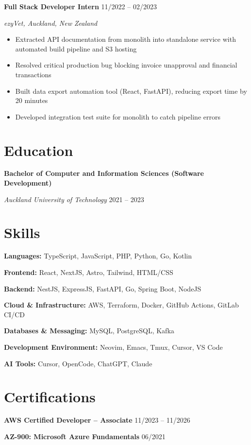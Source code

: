 \documentclass[11pt,a4paper]{article}
\begin{document}
\textbf{Full Stack Developer Intern} \hfill 11/2022 -- 02/2023

\textit{ezyVet, Auckland, New Zealand}

\begin{itemize}[leftmargin=1.5em, itemsep=0.2em]
    \item Extracted API documentation from monolith into standalone service with automated build pipeline and S3 hosting
    \item Resolved critical production bug blocking invoice unapproval and financial transactions
    \item Built data export automation tool (React, FastAPI), reducing export time by 20 minutes
    \item Developed integration test suite for monolith to catch pipeline errors
\end{itemize}

\section*{Education}

\textbf{Bachelor of Computer and Information Sciences (Software Development)}

\textit{Auckland University of Technology} \hfill 2021 -- 2023

\section*{Skills}

\textbf{Languages:} TypeScript, JavaScript, PHP, Python, Go, Kotlin

\textbf{Frontend:} React, NextJS, Astro, Tailwind, HTML/CSS

\textbf{Backend:} NestJS, ExpressJS, FastAPI, Go, Spring Boot, NodeJS

\textbf{Cloud \& Infrastructure:} AWS, Terraform, Docker, GitHub Actions, GitLab CI/CD

\textbf{Databases \& Messaging:} MySQL, PostgreSQL, Kafka

\textbf{Development Environment:} Neovim, Emacs, Tmux, Cursor, VS Code

\textbf{AI Tools:} Cursor, OpenCode, ChatGPT, Claude

\section*{Certifications}

\textbf{AWS Certified Developer -- Associate} \hfill 11/2023 -- 11/2026

\textbf{AZ-900: Microsoft Azure Fundamentals} \hfill 06/2021
\end{document}
